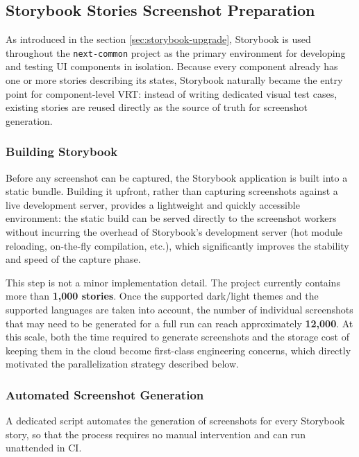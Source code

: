 \subsection{Storybook Stories Screenshot Preparation}

As introduced in the section \ref{sec:storybook-upgrade}, Storybook is used throughout the \texttt{next-common} project as the primary environment for developing and testing \ac{UI} components in isolation. Because every component already has one or more stories describing its states, Storybook naturally became the entry point for component-level \ac{VRT}: instead of writing dedicated visual test cases, existing stories are reused directly as the source of truth for screenshot generation.

\subsubsection{Building Storybook}

Before any screenshot can be captured, the Storybook application is built into a static bundle. Building it upfront, rather than capturing screenshots against a live development server, provides a lightweight and quickly accessible environment: the static build can be served directly to the screenshot workers without incurring the overhead of Storybook's development server (hot module reloading, on-the-fly compilation, etc.), which significantly improves the stability and speed of the capture phase.

This step is not a minor implementation detail. The project currently contains more than \textbf{1,000 stories}. Once the supported dark/light themes and the supported languages are taken into account, the number of individual screenshots that may need to be generated for a full run can reach approximately \textbf{12,000}. At this scale, both the time required to generate screenshots and the storage cost of keeping them in the cloud become first-class engineering concerns, which directly motivated the parallelization strategy described below.

\subsubsection{Automated Screenshot Generation}

A dedicated script automates the generation of screenshots for every Storybook story, so that the process requires no manual intervention and can run unattended in \ac{CI}.

